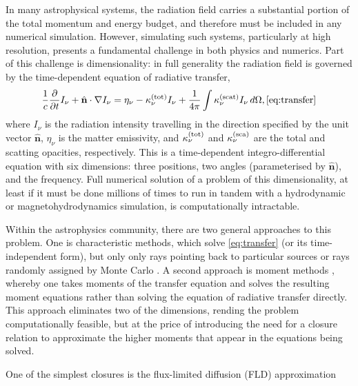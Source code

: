 \documentclass[fleqn,usenatbib]{mnras}
\newcommand{\hatn}{\hat{\mathbf{n}}}
\begin{document}
In many astrophysical systems, the radiation field carries a substantial portion of the total momentum and energy budget, and therefore must be included in any numerical simulation. However, simulating such systems, particularly at high resolution, presents a fundamental challenge in both physics and numerics. Part of this challenge is dimensionality: in full generality the radiation field is governed by the time-dependent equation of radiative transfer,
\begin{equation}
\frac{1}{c} \frac{\partial}{\partial t} I_\nu + \hatn\cdot\nabla I_\nu = \eta_\nu - \kappa^{\rm (tot)}_\nu I_\nu + \frac{1}{4\pi} \int \kappa^{\rm (scat)}_\nu I_\nu \, d\Omega,
\autoref{eq:transfer}
\end{equation}
where $I_\nu$ is the radiation intensity travelling in the direction specified by the unit vector $\hatn$, $\eta_\nu$ is the matter emissivity, and $\kappa_\nu^{\rm (tot)}$ and $\kappa_\nu^{\rm (sca)}$ are the total and scatting opacities, respectively. This is a time-dependent integro-differential equation with six dimensions: three positions, two angles (parameterised by $\hatn$), and the frequency. Full numerical solution of a problem of this dimensionality, at least if it must be done millions of times to run in tandem with a hydrodynamic or magnetohydrodynamics simulation, is computationally intractable. 

Within the astrophysics community, there are two general approaches to this problem. One is characteristic methods, which solve \autoref{eq:transfer} (or its time-independent form), but only only rays pointing back to particular sources \citep[e.g.,][]{Abel02a, Rijkhorst06a, Krumholz07f} or rays randomly assigned by Monte Carlo \citep[e.g.,][]{Fleck71a, Tsang15a}. A second approach is moment methods \citep[e.g.,][]{Mihalas_1984,Castor_2004}, whereby one takes moments of the transfer equation and solves the resulting moment equations rather than solving the equation of radiative transfer directly. This approach eliminates two of the dimensions, rending the problem computationally feasible, but at the price of introducing the need for a closure relation to approximate the higher moments that appear in the equations being solved.

One of the simplest closures is the flux-limited diffusion (FLD) approximation \citep{Alme_1973}

\end{document}
